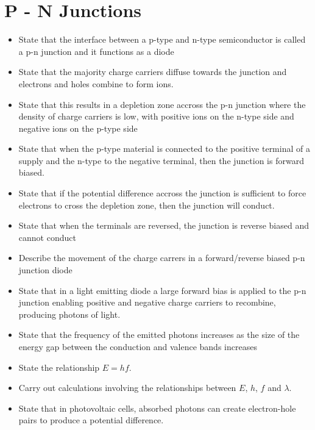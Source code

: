 \section{P - N Junctions}
\begin{multicols}{2}
	\begin{itemize}
        \item State that the interface between a p-type and n-type 
            semiconductor is called a p-n junction and it functions as a diode
        \item State that the majority charge carriers diffuse towards the
            junction and electrons and holes combine to form ions.
        \item State that this results in a depletion zone accross the p-n
            junction where the density of charge carriers is low, with
            positive ions on the n-type side and negative ions on the p-type
            side
        \item State that when the p-type material is connected to the positive
            terminal of a supply and the n-type to the negative terminal, then
            the junction is forward biased.
        \item State that if the potential difference accross the junction is
            sufficient to force electrons to cross the depletion zone, then the
            junction will conduct.
        \item State that when the terminals are reversed, the junction is
            reverse biased and cannot conduct
        \item Describe the movement of the charge carrers in a forward/reverse
            biased p-n junction diode
        \item State that in a light emitting diode a large forward bias is
            applied to the p-n junction enabling positive and negative charge
            carriers to recombine, producing photons of light.
        \item State that the frequency of the emitted photons increases as the
            size of the energy gap between the conduction and valence bands
            increases
        \item State the relationship $E = h f$. 
        \item Carry out calculations involving the relationships between
            $E$, $h$, $f$ and $\lambda$.
        \item State that in photovoltaic cells, absorbed photons can create
            electron-hole pairs to produce a potential difference.

	\end{itemize}
\end{multicols}
